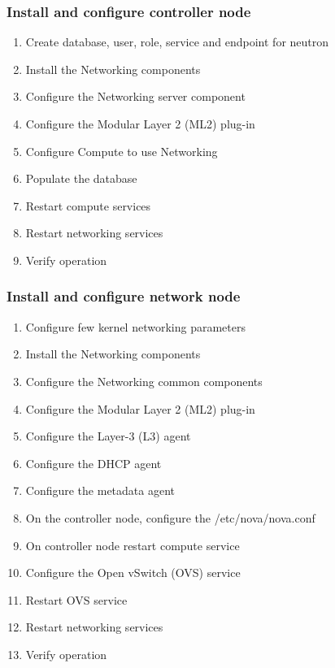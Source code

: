     \subsubsection{Install and configure controller node}
        \begin{enumerate}
            \item Create database, user, role, service and endpoint for neutron
            \item Install the Networking components
            \item Configure the Networking server component
            \item Configure the Modular Layer 2 (ML2) plug-in 
            \item Configure Compute to use Networking 
            \item Populate the database
            \item Restart compute services
            \item Restart networking services        
            \item Verify operation
        \end{enumerate}   
    \subsubsection{Install and configure network node}
        \begin{enumerate}
            \item Configure few kernel networking parameters
            \item Install the Networking components
            \item Configure the Networking common components 
            \item Configure the Modular Layer 2 (ML2) plug-in 
            \item Configure the Layer-3 (L3) agent 
            \item Configure the DHCP agent 
            \item Configure the metadata agent 
            \item On the controller node, configure the /etc/nova/nova.conf
            \item On controller node restart compute service
            \item Configure the Open vSwitch (OVS) service
            \item Restart OVS service
            \item Restart networking services
            \item Verify operation
        \end{enumerate}   
